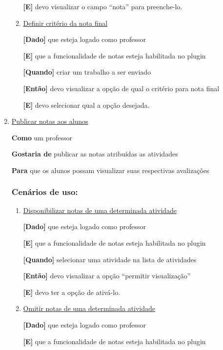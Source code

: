 \begin{enumerate}
\begin{enumerate}
\textbf{[E]} devo visualizar o campo ``nota'' para preenche-lo.

\item \underline{Definir critério da nota final}

\textbf{[Dado]} que esteja logado como professor

\textbf{[E]} que a funcionalidade de notas esteja habilitada no plugin

\textbf{[Quando]} criar um trabalho a ser enviado

\textbf{[Então]} devo visualizar a opção de qual o critério para nota final

\textbf{[E]} devo selecionar qual a opção desejada.

\end{enumerate}


\item \underline{Publicar notas aos alunos}

\textbf{Como} um professor

\textbf{Gostaria de} publicar as notas atribuídas as atividades

\textbf{Para} que os alunos possam visualizar suas respectivas avalizações

\subsubsection*{Cenários de uso:}

\begin{enumerate}
\item \underline{Disponibilizar notas de uma determinada atividade}

\textbf{[Dado]} que esteja logado como professor

\textbf{[E]} que a funcionalidade de notas esteja habilitada no plugin

\textbf{[Quando]} selecionar uma atividade na lista de atividades

\textbf{[Então]} devo visualizar a opção ``permitir visualização''

\textbf{[E]} devo ter a opção de ativá-lo.

\item \underline{Omitir notas de uma determinada atividade}

\textbf{[Dado]} que esteja logado como professor

\textbf{[E]} que a funcionalidade de notas esteja habilitada no plugin


\end{enumerate}
\end{enumerate}
